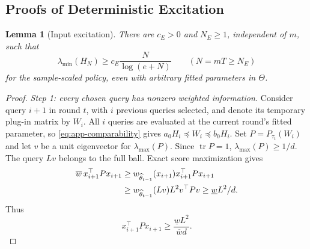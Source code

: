\documentclass[10pt,twoside,letterpaper]{article}
\newtheorem{lemma}{Lemma}[section]
\newcommand{\tr}{\operatorname{tr}}
\begin{document}
\subsection{Proofs of Deterministic Excitation}
\label{app:excitation}

\begin{lemma}[Input excitation]
\label{lem:excitation}
There are $c_E>0$ and $N_E\ge1$, independent of $m$, such that
\begin{equation}
\lambda_{\min}(H_N)\ge c_E\frac N{\log(e+N)}
\qquad(N=mT\ge N_E)
\label{eq:app-excitation}
\end{equation}
for the sample-scaled policy, even with arbitrary fitted parameters
in $\Theta$.
\end{lemma}

\begin{proof}
\textit{Step 1: every chosen query has nonzero weighted information.}
Consider query $i+1$ in round $t$, with $i$ previous queries selected,
and denote its temporary plug-in matrix by $W_i$.
All $i$ queries are evaluated at the current round's fitted parameter,
so \eqref{eq:app-comparability} gives
$a_0H_i\preceq W_i\preceq b_0H_i$.
Set $P=P_{\tau_t}(W_i)$ and let $v$ be a unit eigenvector for
$\lambda_{\max}(P)$. Since $\tr P=1$, $\lambda_{\max}(P)\ge1/d$.
The query $Lv$ belongs to the full ball. Exact score maximization gives
\begin{align}
\overline w\,x_{i+1}^\top Px_{i+1}
&\ge w_{\widehat\theta_{t-1}}(x_{i+1})x_{i+1}^\top Px_{i+1}\notag\\
&\ge w_{\widehat\theta_{t-1}}(Lv)L^2v^\top Pv
\ge\underline wL^2/d.
\label{eq:app-score-lower-proof}
\end{align}
Thus
\begin{equation}
x_{i+1}^\top Px_{i+1}
\ge\frac{\underline wL^2}{\overline w d}.
\label{eq:app-score-lower}
\end{equation}


\end{proof}
\end{document}
